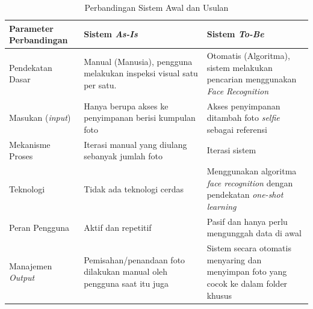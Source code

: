 \begin{table}[t]
	\caption{Perbandingan Sistem Awal dan Usulan}
\label{tab:perbandingan sistem}
\begin{tabular}{ | p{2.5cm} | p{4.75cm} | p{4.75cm} |}
	\hline
	\textbf{Parameter Perbandingan} & \textbf{Sistem \textit{As-Is}} & \textbf{Sistem \textit{To-Be}} \\ \hline
	Pendekatan Dasar & Manual (Manusia), pengguna melakukan inspeksi visual satu per satu. & Otomatis (Algoritma), sistem melakukan pencarian menggunakan \textit{Face Recognition} \\ \hline
    Masukan (\textit{input}) & Hanya berupa akses ke penyimpanan berisi kumpulan foto & Akses penyimpanan ditambah foto \textit{selfie} sebagai referensi \\ \hline
    Mekanisme Proses & Iterasi manual yang diulang sebanyak jumlah foto & Iterasi sistem \\ \hline
    Teknologi & Tidak ada teknologi cerdas & Menggunakan algoritma \textit{face recognition} dengan pendekatan \textit{one-shot learning} \\ \hline
    Peran Pengguna & Aktif dan repetitif & Pasif dan hanya perlu mengunggah data di awal \\ \hline
    Manajemen \textit{Output} & Pemisahan/penandaan foto dilakukan manual oleh pengguna saat itu juga & Sistem secara otomatis menyaring dan menyimpan foto yang cocok ke dalam folder khusus \\ \hline
\end{tabular}
\end{table}
